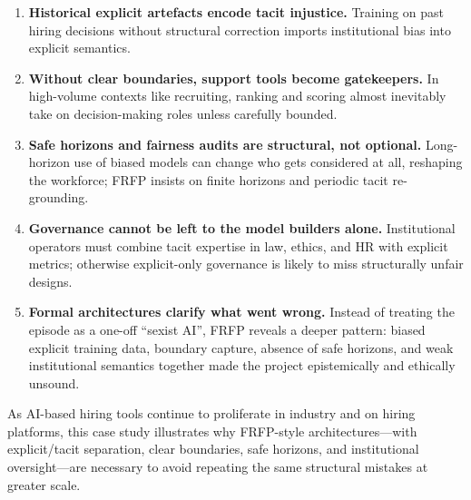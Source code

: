 \begin{enumerate}
  \item \textbf{Historical explicit artefacts encode tacit injustice.}
        Training on past hiring decisions without structural correction
        imports institutional bias into explicit semantics.

  \item \textbf{Without clear boundaries, support tools become gatekeepers.}
        In high-volume contexts like recruiting, ranking and scoring almost
        inevitably take on decision-making roles unless carefully bounded.

  \item \textbf{Safe horizons and fairness audits are structural, not optional.}
        Long-horizon use of biased models can change who gets considered at
        all, reshaping the workforce; FRFP insists on finite horizons and
        periodic tacit re-grounding.

  \item \textbf{Governance cannot be left to the model builders alone.}
        Institutional operators must combine tacit expertise in law, ethics,
        and HR with explicit metrics; otherwise explicit-only governance is
        likely to miss structurally unfair designs.

  \item \textbf{Formal architectures clarify what went wrong.}
        Instead of treating the episode as a one-off ``sexist AI'', FRFP
        reveals a deeper pattern:
        biased explicit training data, boundary capture, absence of safe
        horizons, and weak institutional semantics together made the project
        epistemically and ethically unsound.
\end{enumerate}

As AI-based hiring tools continue to proliferate in industry and on hiring
platforms, this case study illustrates why FRFP-style architectures---with
explicit/tacit separation, clear boundaries, safe horizons, and institutional
oversight---are necessary to avoid repeating the same structural mistakes
at greater scale.
